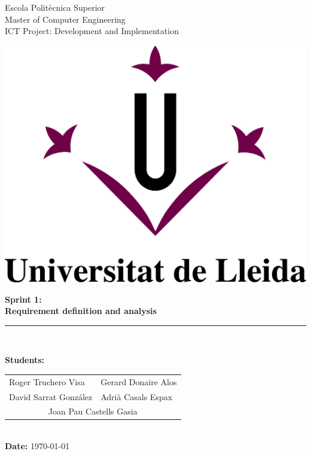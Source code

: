 \documentclass[11pt,a4paper]{article}
\begin{document}
\begin{titlepage}

\begin{flushleft}
Escola Politècnica Superior\\
\vspace*{0.15in}
Master of Computer Engineering\\
\vspace*{0.15in}
ICT Project: Development and Implementation
\end{flushleft}

\begin{center}
\vspace{2.0cm}\includegraphics[scale=0.3]{figures/M-UdL.jpg}
\vspace{5.0cm}

\begin{LARGE}
\textbf{Sprint 1:}\\ 
\vspace*{0.15in}
\textbf{Requirement definition and analysis}
\end{LARGE}
\vspace{5.0cm}

\vspace*{0.25in}
\rule{80mm}{0.1mm}\\
\vspace*{0.1in}

\begin{large}
\textbf{Students:}

\begin{tabular}{ll}
Roger Truchero Visa  & Gerard Donaire Alos \\
David Sarrat González  & Adrià Casals Espax \\
\multicolumn{2}{c}{Joan Pau Castells Gasia}
\end{tabular}
\\
\textbf{Date:} \today
\end{large}

\end{center}
\end{titlepage}
\end{document}

